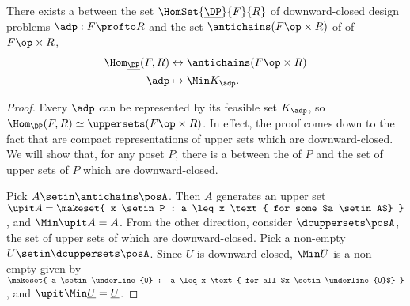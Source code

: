 \begin{lemma}
    There exists a  between the set $\HomSet{\underline{\DP}}{F}{R}$ of downward-closed design problems $\adp : F \profto R$ and the set $\antichains (F\op \times R)$ of   of $F\op \times R$, %
    \begin{equation}
        \begin{aligned}
            \Hom_{\underline{\DP}}(F,R) & \leftrightarrow \antichains (F\op \times R) \\
            \adp                        & \mapsto \Min K_\adp.
        \end{aligned}
    \end{equation}
\end{lemma}
\begin{proof}
    Every $\adp$ can be represented by its feasible set $K_\adp$, so $\Hom_\DP(F,R) \simeq \uppersets (F\op \times R)$.
    In effect, the proof comes down to the fact that   are compact representations of upper sets which are downward-closed.
    We will show that, for any poset $P$, there is a  between the   of $P$ and the set of upper sets of $P$ which are downward-closed.

    Pick $A \setin \antichains\posA$.
    Then $A$ generates an upper set $\upit A = \makeset{ x \setin P : a \leq x \text{ for some $a \setin A$} }$, and $\Min \upit A = A$.
    From the other direction, consider $\dcuppersets \posA$, the set of upper sets of \posA which are downward-closed.
    Pick a non-empty $U \setin \dcuppersets \posA$.
    Since $U$ is downward-closed, $\Min U$ is a non-empty    given by $\makeset{ a \setin \underline{U} : a \leq x \text{ for all $x \setin \underline{U}$} }$, and $\upit \Min \underline{U} = \underline{U}$.
\end{proof}

